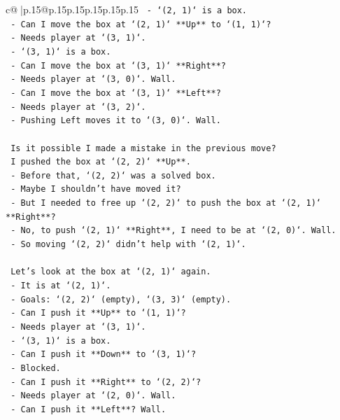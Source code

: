 \documentclass{article}
\begin{document}
{\begin{supertabular}{c@{$\;$}|p{.15\linewidth}@{}p{.15\linewidth}p{.15\linewidth}p{.15\linewidth}p{.15\linewidth}p{.15\linewidth}}
{{{\texttt{   {-} `(2, 1)` is a box.} \\
\texttt{   {-} Can I move the box at `(2, 1)` **Up** to `(1, 1)`?} \\
\texttt{     {-} Needs player at `(3, 1)`.} \\
\texttt{     {-} `(3, 1)` is a box.} \\
\texttt{   {-} Can I move the box at `(3, 1)` **Right**?} \\
\texttt{     {-} Needs player at `(3, 0)`. Wall.} \\
\texttt{   {-} Can I move the box at `(3, 1)` **Left**?} \\
\texttt{     {-} Needs player at `(3, 2)`.} \\
\texttt{     {-} Pushing Left moves it to `(3, 0)`. Wall.} \\
\\ 
\texttt{   Is it possible I made a mistake in the previous move?} \\
\texttt{   I pushed the box at `(2, 2)` **Up**.} \\
\texttt{   {-} Before that, `(2, 2)` was a solved box.} \\
\texttt{   {-} Maybe I shouldn't have moved it?} \\
\texttt{   {-} But I needed to free up `(2, 2)` to push the box at `(2, 1)` **Right**?} \\
\texttt{   {-} No, to push `(2, 1)` **Right**, I need to be at `(2, 0)`. Wall.} \\
\texttt{   {-} So moving `(2, 2)` didn't help with `(2, 1)`.} \\
\\ 
\texttt{   Let's look at the box at `(2, 1)` again.} \\
\texttt{   {-} It is at `(2, 1)`.} \\
\texttt{   {-} Goals: `(2, 2)` (empty), `(3, 3)` (empty).} \\
\texttt{   {-} Can I push it **Up** to `(1, 1)`?} \\
\texttt{     {-} Needs player at `(3, 1)`.} \\
\texttt{     {-} `(3, 1)` is a box.} \\
\texttt{   {-} Can I push it **Down** to `(3, 1)`?} \\
\texttt{     {-} Blocked.} \\
\texttt{   {-} Can I push it **Right** to `(2, 2)`?} \\
\texttt{     {-} Needs player at `(2, 0)`. Wall.} \\
\texttt{   {-} Can I push it **Left**? Wall.} \\
}}}
\end{supertabular}}
\end{document}
